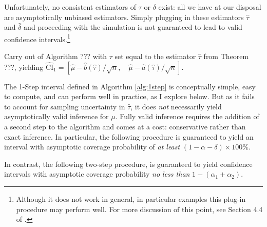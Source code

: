 
Unfortunately, no consistent estimators of $\tau$ or $\delta$ exist: all we have at our disposal are asymptotically unbiased estimators.
Simply plugging in these estimators $\widehat{\tau}$ and $\widehat{\delta}$ and proceeding with the simulation is not guaranteed to lead to valid confidence intervals.\footnote{Although it does not work in general, in particular examples this plug-in procedure may perform well. For more discussion of this point, see Section 4.4 of \cite{DiTraglia2016}.}

\begin{alg}[1-Step CI] 
  \label{alg:1step}
Carry out of Algorithm ??? with $\tau$ set equal to the estimator $\widehat{\tau}$ from Theorem ???, yielding 
$ \widehat{\mbox{CI}}_{1}=\left[ \widehat{\mu} - \widehat{b}(\widehat{\tau})/\sqrt{n}, \quad \widehat{\mu} - \widehat{a}(\widehat{\tau})/\sqrt{n} \right]$.
\end{alg}

The 1-Step interval defined in Algorithm \ref{alg:1step} is conceptually simple, easy to compute, and can perform well in practice, as I explore below.
But as it fails to account for sampling uncertainty in $\widehat{\tau}$,  it does \emph{not} necessarily yield asymptotically valid inference for $\mu$.
Fully valid inference requires the addition of a second step to the algorithm and comes at a cost: conservative rather than exact inference.
In particular, the following procedure is guaranteed to yield an interval with asymptotic coverage probability of \emph{at least} $(1-\alpha-\delta)\times 100\%$.

In contrast, the following two-step procedure, is guaranteed to yield confidence intervals with asymptotic coverage probability \emph{no less than} $1-(\alpha_1 + \alpha_2)$.

